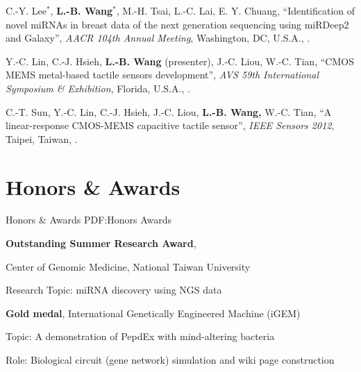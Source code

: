 \documentclass[a4paper,12pt,oneside]{article}
\begin{document}
\begin{body}
\begin{publication}[widest*=100]
    \item
        C.-Y. Lee$^*$, \textbf{L.-B. Wang}$^*$, M.-H. Tsai, L.-C. Lai, E. Y. Chuang,
        ``Identification of novel miRNAs in breast data of the next generation sequencing using miRDeep2 and Galaxy'',
        \textit{AACR 104th Annual Meeting},
        Washington, DC, U.S.A.,
        .

    \item
        Y.-C. Lin, C.-J. Hsieh, \textbf{L.-B. Wang} (presenter), J.-C. Liou, W.-C. Tian,
        ``CMOS MEMS metal-based tactile sensors development'',
        \textit{AVS 59th International Symposium \& Exhibition},
        Florida, U.S.A.,
        .

    \item
        C.-T. Sun, Y.-C. Lin, C.-J. Hsieh, J.-C. Liou, \textbf{L.-B. Wang,} W.-C. Tian,
        ``A linear-response CMOS-MEMS capacitive tactile sensor'',
        \textit{IEEE Sensors 2012},
        Taipei, Taiwan,
        .

\end{publication}



\section
{Honors\newline
\& Awards}
{Honors \& Awards}
{PDF:Honors Awards}

\textbf{Outstanding Summer Research Award},
\hfill
{}
\par
Center of Genomic Medicine, National Taiwan University
\begin{detail}
    \begin{detailitem}
    \item Research Topic: miRNA discovery using NGS data
    \end{detailitem}
\end{detail}

\EntryGapNoBreak
\textbf{Gold medal},
International Genetically Engineered Machine (iGEM)
\hfill
{}
\begin{detail}
    \begin{detailitem}
    \item Topic: A demonstration of PepdEx with mind-altering bacteria
    \item Role: Biological circuit (gene network) simulation and wiki page construction
    \end{detailitem}
\end{detail}



\end{body}
\end{document}
